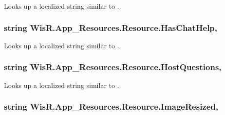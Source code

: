 Looks up a localized string similar to . 

\hypertarget{class_wis_r_1_1_app___resources_1_1_resource_a6097d990dc5d69b7561aed2481d16ef4}{}
\subsubsection[{Has\+Chat\+Help}]{\setlength{\rightskip}{0pt plus 5cm}string Wis\+R.\+App\+\_\+\+Resources.\+Resource.\+Has\+Chat\+Help\hspace{0.3cm}{\ttfamily [static]}, {\ttfamily [get]}}\label{class_wis_r_1_1_app___resources_1_1_resource_a6097d990dc5d69b7561aed2481d16ef4}


Looks up a localized string similar to . 

\hypertarget{class_wis_r_1_1_app___resources_1_1_resource_aaf80c566ef59c3067497af0bee07327c}{}
\subsubsection[{Host\+Questions}]{\setlength{\rightskip}{0pt plus 5cm}string Wis\+R.\+App\+\_\+\+Resources.\+Resource.\+Host\+Questions\hspace{0.3cm}{\ttfamily [static]}, {\ttfamily [get]}}\label{class_wis_r_1_1_app___resources_1_1_resource_aaf80c566ef59c3067497af0bee07327c}


Looks up a localized string similar to . 

\hypertarget{class_wis_r_1_1_app___resources_1_1_resource_afd0827425222d904f98c12babf07df00}{}
\subsubsection[{Image\+Resized}]{\setlength{\rightskip}{0pt plus 5cm}string Wis\+R.\+App\+\_\+\+Resources.\+Resource.\+Image\+Resized\hspace{0.3cm}{\ttfamily [static]}, {\ttfamily [get]}}\label{class_wis_r_1_1_app___resources_1_1_resource_afd0827425222d904f98c12babf07df00}


